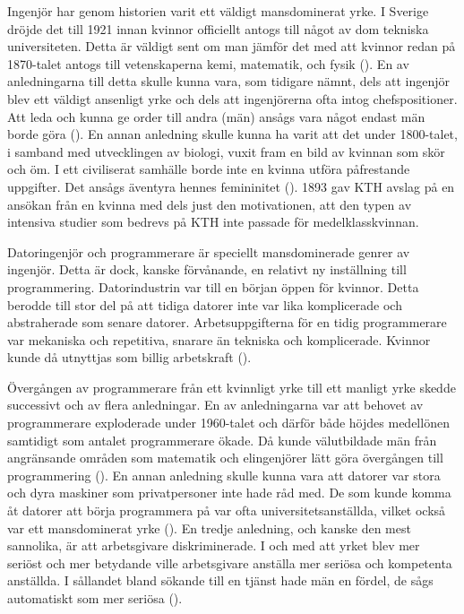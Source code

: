 Ingenjör har genom historien varit ett väldigt mansdominerat yrke. I Sverige dröjde det till 1921 innan kvinnor officiellt antogs till något av dom tekniska universiteten. Detta är väldigt sent om man jämför det med att kvinnor redan på 1870-talet antogs till vetenskaperna kemi, matematik, och fysik (\cite[s.\ 78--80]{Berner2000}). En av anledningarna till detta skulle kunna vara, som tidigare nämnt, dels att ingenjör blev ett väldigt ansenligt yrke och dels att ingenjörerna ofta intog chefspositioner. Att leda och kunna ge order till andra (män) ansågs vara något endast män borde göra (\cite[s.\ 85--90]{Berner2000}). En annan anledning skulle kunna ha varit att det under 1800-talet, i samband med utvecklingen av biologi, vuxit fram en bild av kvinnan som skör och öm. I ett civiliserat samhälle borde inte en kvinna utföra påfrestande uppgifter. Det ansågs äventyra hennes femininitet (\cite[s.\ 83--89]{Larsson2006}). 1893 gav KTH avslag på en ansökan från en kvinna med dels just den motivationen, att den typen av intensiva studier som bedrevs på KTH inte passade för medelklasskvinnan.

Datoringenjör och programmerare är speciellt mansdominerade genrer av ingenjör. Detta är dock, kanske förvånande, en relativt ny inställning till programmering. Datorindustrin var till en början öppen för kvinnor. Detta berodde till stor del på att tidiga datorer inte var lika komplicerade och abstraherade som senare datorer. Arbetsuppgifterna för en tidig programmerare var mekaniska och repetitiva, snarare än tekniska och komplicerade. Kvinnor kunde då utnyttjas som billig arbetskraft (\cite[s.\ 43--45]{Ensmenger2015}).

Övergången av programmerare från ett kvinnligt yrke till ett manligt yrke skedde successivt och av flera anledningar. En av anledningarna var att behovet av programmerare exploderade under 1960-talet och därför både höjdes medellönen samtidigt som antalet programmerare ökade. Då kunde välutbildade män från angränsande områden som matematik och elingenjörer lätt göra övergången till programmering (\cite[s.\ 43--50]{Ensmenger2015}). En annan anledning skulle kunna vara att datorer var stora och dyra maskiner som privatpersoner inte hade råd med. De som kunde komma åt datorer att börja programmera på var ofta universitetsanställda, vilket också var ett mansdominerat yrke (\cite[s.\ 43--45]{Ensmenger2015}). En tredje anledning, och kanske den mest sannolika, är att arbetsgivare diskriminerade. I och med att yrket blev mer seriöst och mer betydande ville arbetsgivare anställa mer seriösa och kompetenta anställda. I sållandet bland sökande till en tjänst hade män en fördel, de sågs automatiskt som mer seriösa (\cite[s.\ 50--51]{Ensmenger2015}).

